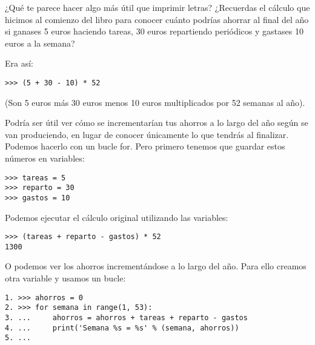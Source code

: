 ¿Qué te parece hacer algo más útil que imprimir letras?  ¿Recuerdas el cálculo que hicimos al comienzo del libro para conocer cuánto podrías ahorrar al final del año si ganases 5 euros haciendo tareas, 30 euros repartiendo periódicos y gastases 10 euros a la semana?
\par
\noindent
Era así:

\begin{listing}
\begin{verbatim}
>>> (5 + 30 - 10) * 52
\end{verbatim}
\end{listing}

\noindent
(Son 5 euros más 30 euros menos 10 euros multiplicados por 52 semanas al año).

Podría ser útil ver cómo se incrementarían tus ahorros a lo largo del año según se van produciendo, en lugar de conocer únicamente lo que tendrás al finalizar.  Podemos hacerlo con un bucle for.  Pero primero tenemos que guardar estos números en variables:

\begin{listing}
\begin{verbatim}
>>> tareas = 5
>>> reparto = 30
>>> gastos = 10
\end{verbatim}
\end{listing}

Podemos ejecutar el cálculo original utilizando las variables:

\begin{listing}
\begin{verbatim}
>>> (tareas + reparto - gastos) * 52
1300
\end{verbatim}
\end{listing}

O podemos ver los ahorros incrementándose a lo largo del año. Para ello creamos otra variable y usamos un bucle:

\begin{listing}
\begin{verbatim}
1. >>> ahorros = 0
2. >>> for semana in range(1, 53):
3. ...     ahorros = ahorros + tareas + reparto - gastos
4. ...     print('Semana %s = %s' % (semana, ahorros))
5. ...
\end{verbatim}
\end{listing}

